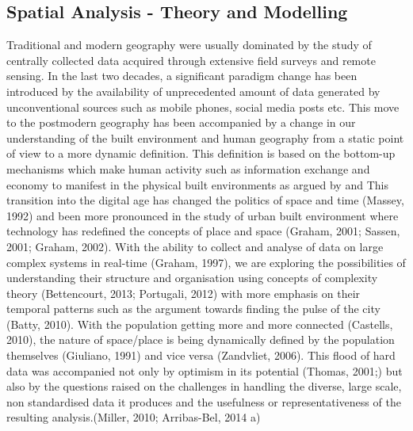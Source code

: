 
\subsection{Spatial Analysis - Theory and Modelling}

Traditional and modern geography were usually dominated by the study of centrally collected data acquired through extensive field surveys and remote sensing.
In the last two decades, a significant paradigm change has been introduced by the availability of unprecedented amount of data generated by unconventional sources such as mobile phones, social media posts etc.
This move to the postmodern geography \cite{soja1989} has been accompanied by a change in our understanding of the built environment and human geography from a static point of view to a more dynamic definition.
This definition is based on the bottom-up mechanisms which make human activity such as information exchange and economy to manifest in the physical built environments as argued by \citet{batty1990, batty1997, batty2012} and \citet{batty2013, batty2013a}
This transition into the digital age \citep{graham1999, tranos2012, tranos2013} has changed the politics of space and time (Massey, 1992) and been more pronounced in the study of urban built environment where technology has redefined the concepts of place and space (Graham, 2001; Sassen, 2001; Graham, 2002).
With the ability to collect and analyse of data on large complex systems in real-time (Graham, 1997), we are exploring the possibilities of understanding their structure and organisation using concepts of complexity theory (Bettencourt, 2013; Portugali, 2012) with more emphasis on their temporal patterns such as the argument towards finding the pulse of the city (Batty, 2010).
With the population getting more and more connected (Castells, 2010), the nature of space/place is being dynamically defined by the population themselves (Giuliano, 1991) and vice versa (Zandvliet, 2006).
This flood of hard data \cite{nature2008} was accompanied not only by optimism in its potential (Thomas, 2001;) but also by the questions raised on the challenges in handling the diverse, large scale, non standardised data it produces and the usefulness or representativeness of the resulting analysis.(Miller, 2010; Arribas-Bel, 2014 a)

